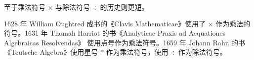        至于乘法符号 $\times$ 与除法符号 $\div$ 的历史则更短。

        \begin{displayquote}
            1628 年 William Oughtred 成书的《Clavis Mathematicae》使用了 $\times$ 作为乘法的符号。1631 年 Thomah Harriot 的书《Analyticae Praxis ad Aequationes Algebraicas Resolvendas》 使用点号作为乘法符号。1659 年 Johann Rahn 的书《Teutsche Algebra》使用星号 $*$ 作为乘法符号，使用 $\div$ 作为除法符号。
        \end{displayquote}


